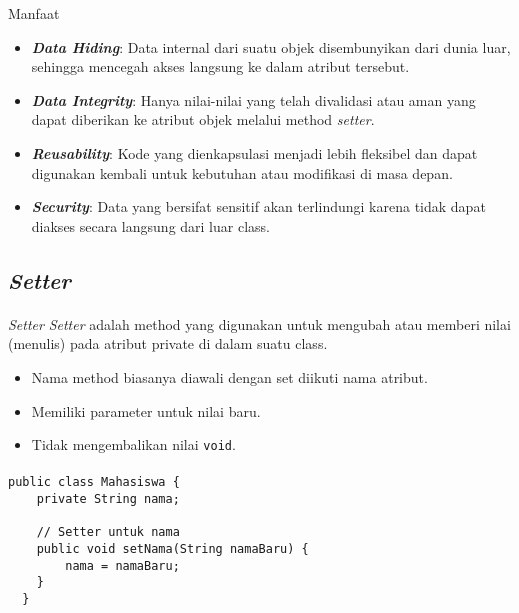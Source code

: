 \documentclass{../praktikum-ppt}
\begin{document}
    \begin{frame}{\insertsection}
      \begin{block}{Manfaat}
        \begin{itemize}
          \item \textbf{\textit{Data Hiding}}: Data internal dari suatu objek disembunyikan dari dunia luar, sehingga mencegah akses langsung ke dalam atribut tersebut.
          \item \textbf{\textit{Data Integrity}}: Hanya nilai-nilai yang telah divalidasi atau aman yang dapat diberikan ke atribut objek melalui method \textit{setter}.
          \item \textbf{\textit{Reusability}}: Kode yang dienkapsulasi menjadi lebih fleksibel dan dapat digunakan kembali untuk kebutuhan atau modifikasi di masa depan.
          \item \textbf{\textit{Security}}: Data yang bersifat sensitif akan terlindungi karena tidak dapat diakses secara langsung dari luar class.
        \end{itemize}
      \end{block}
    \end{frame}

    \subsection{\textit{Setter}}
    \begin{frame}{\insertsection}
      \framesubtitle{\insertsubsection}
      \begin{block}{\textit{Setter}}
        \textit{Setter} adalah method yang digunakan untuk mengubah atau memberi nilai (menulis) pada atribut private di dalam suatu class.
        \begin{itemize}
          \item Nama method biasanya diawali dengan set diikuti nama atribut.
          \item Memiliki parameter untuk nilai baru.
          \item Tidak mengembalikan nilai \texttt{void}.
        \end{itemize}
      \end{block}
    \end{frame}

    \begin{frame}[fragile]{\insertsection}
      \framesubtitle{\insertsubsection}
      \begin{lstlisting}[caption={Penggunaan \textit{setter}}]
  public class Mahasiswa {
    private String nama;

    // Setter untuk nama
    public void setNama(String namaBaru) {
        nama = namaBaru;
    }
  }
      \end{lstlisting}
    \end{frame}
\end{document}

